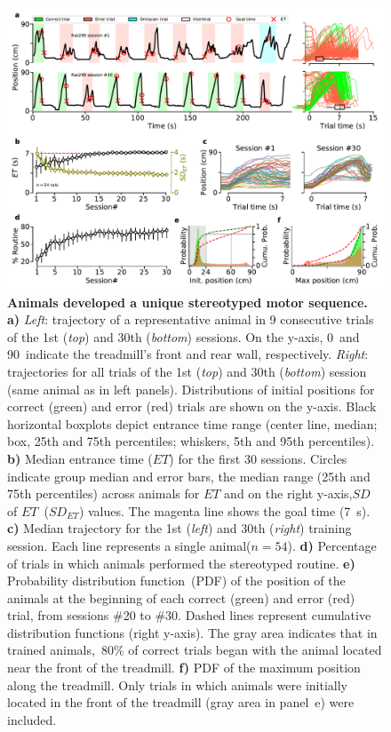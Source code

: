 \begin{figure}[bt!]
    \begin{center}
      \includegraphics[width=\textwidth]{ch-time/figures/CtrlTrd.pdf}
      \caption[Control Condition]
      {\textbf{Animals developed a unique stereotyped motor sequence.}
      \textbf{a)}
      \textit{Left}: trajectory of a representative animal in 9 consecutive trials of the 1st (\textit{top}) and 30th (\textit{bottom}) sessions.
      On the y-axis, 0~and 90~indicate the treadmill's front and rear wall, respectively.
      \textit{Right}: trajectories for all trials of the 1st (\textit{top}) and 30th (\textit{bottom}) session (same animal as in left panels).
      Distributions of initial positions for correct (green) and error (red) trials are shown on the y-axis.
      Black horizontal boxplots depict entrance time range (center line, median; box, 25th and 75th percentiles; whiskers, 5th and 95th percentiles).
      \textbf{b)}
      Median entrance time ($ET$) for the first 30 sessions.
      Circles indicate group median and error bars, the median range (25th and 75th percentiles) across animals for $ET$ and on the right y-axis,$SD$ of $ET$~($SD_{ET}$) values.
      The magenta line shows the goal time (7~s).
      \textbf{c)}
      Median trajectory for the 1st (\textit{left}) and 30th (\textit{right}) training session.
      Each line represents a single animal($n=54$).
      \textbf{d)}
      Percentage of trials in which animals performed the stereotyped routine.
      \textbf{e)}
      Probability distribution function~(PDF) of the position of the animals at the beginning of each correct (green) and error (red) trial, from sessions \#20 to \#30.
      Dashed lines represent cumulative distribution functions (right y-axis).
      The gray area indicates that in trained animals,~80\% of correct trials began with the animal located near the front of the treadmill.
      \textbf{f)}
      PDF of the maximum position along the treadmill.
      Only trials in which animals were initially located in the front of the treadmill (gray area in panel~e) were included.
    }
    \label{fig:time:CtrlTrd}
    \end{center}
  \end{figure}